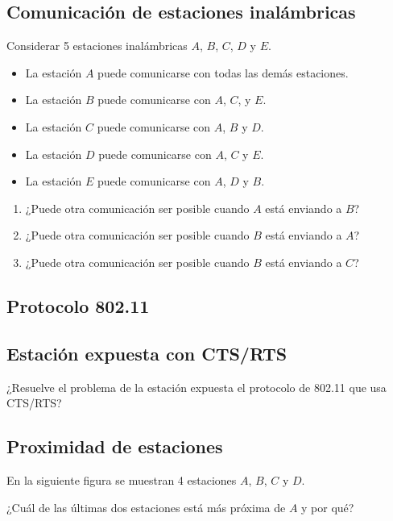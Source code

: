 \documentclass[12pt]{report}
\begin{document}
\begin{exer}
	\subsection{Comunicación de estaciones inalámbricas \sthree \steo}
	Considerar 5 estaciones inalámbricas $A$, $B$, $C$, $D$ y $E$.

	\begin{itemize}
		\item La estación $A$ puede comunicarse con todas las demás estaciones.
		\item La estación $B$ puede comunicarse con $A$, $C$, y $E$.
		\item La estación $C$ puede comunicarse con $A$, $B$ y $D$.
		\item La estación $D$ puede comunicarse con $A$, $C$ y $E$.
		\item La estación $E$ puede comunicarse con $A$, $D$ y $B$.
	\end{itemize}

	\begin{enumerate}
		\item ¿Puede otra comunicación ser posible cuando $A$ está enviando a $B$?
		\item ¿Puede otra comunicación ser posible cuando $B$ está enviando a $A$?
		\item ¿Puede otra comunicación ser posible cuando $B$ está enviando a $C$?
	\end{enumerate}
\end{exer}

\begin{exer}
	\section{Protocolo 802.11}
	\subsection{Estación expuesta con CTS/RTS \stwo \steo}
	¿Resuelve el problema de la estación expuesta el protocolo de 802.11 que usa CTS/RTS?
\end{exer}

\begin{exer}
	\subsection{Proximidad de estaciones \sthree}
	En la siguiente figura se muestran 4 estaciones $A$, $B$, $C$ y $D$.


	¿Cuál de las últimas dos estaciones está más próxima de $A$ y por qué?
\end{exer}
\end{document}
